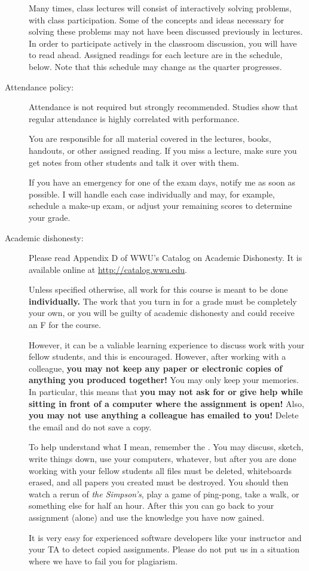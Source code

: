 \documentclass{article}
\begin{document}
\begin{description}
  Many times, class lectures will consist of interactively solving
  problems, with class participation.  Some of the concepts and ideas
  necessary for solving these problems may not have been discussed
  previously in lectures.  In order to participate actively in the
  classroom discussion, you will have to read ahead.  Assigned
  readings for each lecture are in the schedule, below.  Note that
  this schedule may change as the quarter progresses.

\item[Attendance policy:] Attendance is not required but strongly
  recommended.  Studies show that regular attendance is highly
  correlated with performance.  

  You are responsible for all material covered in the lectures, books,
  handouts, or other assigned reading.  If you miss a lecture, make
  sure you get notes from other students and talk it over with them.

  If you have an emergency for one of the exam days, notify me as soon
  as possible.  I will handle each case individually and may, for
  example, schedule a make-up exam, or adjust your remaining scores to
  determine your grade.

\item[Academic dishonesty:] Please read Appendix D of WWU's Catalog on
  Academic Dishonesty.  It is available online at
  \url{http://catalog.wwu.edu}.

  Unless specified otherwise, all work for this course is meant to
  be done {\bf individually.}  The work that you turn in for a grade
  must be completely your own, or you will be guilty of academic
  dishonesty and could receive an F for the course.

  However, it can be a valiable learning experience to discuss
  work with your fellow students, and this is encouraged.
  However, after working with a colleague, {\bf you may not keep any
    paper or electronic copies of anything you produced together!}
  You may only keep your memories.  In particular, this means that
  {\bf you may not ask for or give help while sitting in front of a
    computer where the assignment is open!}  Also, {\bf you may not
    use anything a colleague has emailed to you!}  Delete the email
  and do not save a copy.

  To help understand what I mean, remember the {}.  You may discuss, sketch, write things down, use
  your computers, whatever, but after you are done working with your
  fellow students all files must be deleted, whiteboards erased, and
  all papers you created must be destroyed.  You should then watch a
  rerun of {\em the Simpson's}, play a game of ping-pong, take a walk,
  or something else for half an hour. After this you can go back to
  your assignment (alone) and use the knowledge you have now gained.

  It is very easy for experienced software developers like your
  instructor and your TA to detect copied assignments.  Please do not
  put us in a situation where we have to fail you for plagiarism.

\end{description}
\end{document}
